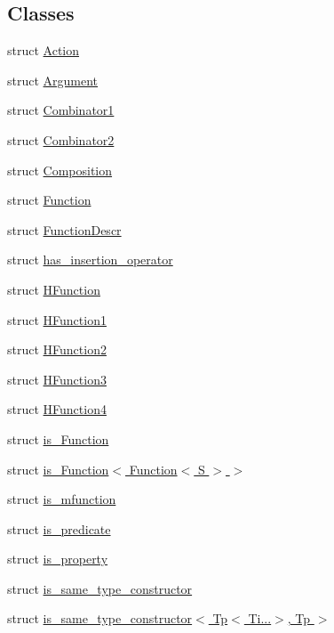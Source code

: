 \subsection*{Classes}
\begin{DoxyCompactItemize}
\item 
struct \hyperlink{structpfq_1_1lang_1_1Action}{Action}
\item 
struct \hyperlink{structpfq_1_1lang_1_1Argument}{Argument}
\item 
struct \hyperlink{structpfq_1_1lang_1_1Combinator1}{Combinator1}
\item 
struct \hyperlink{structpfq_1_1lang_1_1Combinator2}{Combinator2}
\item 
struct \hyperlink{structpfq_1_1lang_1_1Composition}{Composition}
\item 
struct \hyperlink{structpfq_1_1lang_1_1Function}{Function}
\item 
struct \hyperlink{structpfq_1_1lang_1_1FunctionDescr}{Function\+Descr}
\item 
struct \hyperlink{structpfq_1_1lang_1_1has__insertion__operator}{has\+\_\+insertion\+\_\+operator}
\item 
struct \hyperlink{structpfq_1_1lang_1_1HFunction}{H\+Function}
\item 
struct \hyperlink{structpfq_1_1lang_1_1HFunction1}{H\+Function1}
\item 
struct \hyperlink{structpfq_1_1lang_1_1HFunction2}{H\+Function2}
\item 
struct \hyperlink{structpfq_1_1lang_1_1HFunction3}{H\+Function3}
\item 
struct \hyperlink{structpfq_1_1lang_1_1HFunction4}{H\+Function4}
\item 
struct \hyperlink{structpfq_1_1lang_1_1is__Function}{is\+\_\+\+Function}
\item 
struct \hyperlink{structpfq_1_1lang_1_1is__Function_3_01Function_3_01S_01_4_01_4}{is\+\_\+\+Function$<$ Function$<$ S $>$ $>$}
\item 
struct \hyperlink{structpfq_1_1lang_1_1is__mfunction}{is\+\_\+mfunction}
\item 
struct \hyperlink{structpfq_1_1lang_1_1is__predicate}{is\+\_\+predicate}
\item 
struct \hyperlink{structpfq_1_1lang_1_1is__property}{is\+\_\+property}
\item 
struct \hyperlink{structpfq_1_1lang_1_1is__same__type__constructor}{is\+\_\+same\+\_\+type\+\_\+constructor}
\item 
struct \hyperlink{structpfq_1_1lang_1_1is__same__type__constructor_3_01Tp_3_01Ti_8_8_8_4_00_01Tp_01_4}{is\+\_\+same\+\_\+type\+\_\+constructor$<$ Tp$<$ Ti...$>$, Tp $>$}

\end{DoxyCompactItemize}
